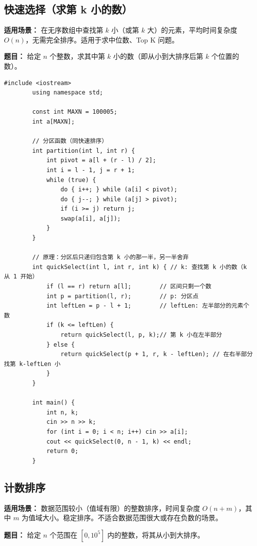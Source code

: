 \documentclass[12pt,a4paper]{ctexart}
\begin{document}
	\subsection{快速选择（求第 k 小的数）}
	\textbf{适用场景：} 在无序数组中查找第 $k$ 小（或第 $k$ 大）的元素，平均时间复杂度 $O(n)$，无需完全排序。适用于求中位数、Top K 问题。
	
	\textbf{题目：} 给定 $n$ 个整数，求其中第 $k$ 小的数（即从小到大排序后第 $k$ 个位置的数）。
	
	\begin{lstlisting}[caption={快速选择——基于快排分区，只递归一边}]
		#include <iostream>
		using namespace std;
		
		const int MAXN = 100005;
		int a[MAXN];
		
		// 分区函数（同快速排序）
		int partition(int l, int r) {
			int pivot = a[l + (r - l) / 2];
			int i = l - 1, j = r + 1;
			while (true) {
				do { i++; } while (a[i] < pivot);
				do { j--; } while (a[j] > pivot);
				if (i >= j) return j;
				swap(a[i], a[j]);
			}
		}
		
		// 原理：分区后只递归包含第 k 小的那一半，另一半舍弃
		int quickSelect(int l, int r, int k) { // k: 查找第 k 小的数（k 从 1 开始）
			if (l == r) return a[l];        // 区间只剩一个数
			int p = partition(l, r);        // p: 分区点
			int leftLen = p - l + 1;        // leftLen: 左半部分的元素个数
			if (k <= leftLen) {
				return quickSelect(l, p, k);// 第 k 小在左半部分
			} else {
				return quickSelect(p + 1, r, k - leftLen); // 在右半部分找第 k-leftLen 小
			}
		}
		
		int main() {
			int n, k;
			cin >> n >> k;
			for (int i = 0; i < n; i++) cin >> a[i];
			cout << quickSelect(0, n - 1, k) << endl;
			return 0;
		}
	\end{lstlisting}
	
	\subsection{计数排序}
	\textbf{适用场景：} 数据范围较小（值域有限）的整数排序，时间复杂度 $O(n+m)$，其中 $m$ 为值域大小。稳定排序。不适合数据范围很大或存在负数的场景。
	
	\textbf{题目：} 给定 $n$ 个范围在 $[0, 10^5]$ 内的整数，将其从小到大排序。
	
\end{document}
